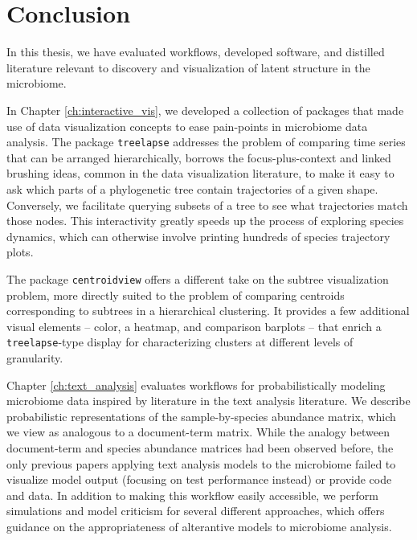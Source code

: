 \chapter{Conclusion}
\label{ch:conclusion}

In this thesis, we have evaluated workflows, developed software, and distilled
literature relevant to discovery and visualization of latent structure in the
microbiome.

In Chapter \ref{ch:interactive_vis}, we developed a collection of packages that
made use of data visualization concepts to ease pain-points in microbiome data
analysis. The package \texttt{treelapse} addresses the problem of comparing time
series that can be arranged hierarchically, borrows the focus-plus-context and
linked brushing ideas, common in the data visualization literature, to make it
easy to ask which parts of a phylogenetic tree contain trajectories of a given
shape. Conversely, we facilitate querying subsets of a tree to see what
trajectories match those nodes. This interactivity greatly speeds up the process
of exploring species dynamics, which can otherwise involve printing hundreds of
species trajectory plots.

The package \texttt{centroidview} offers a different take on the subtree
visualization problem, more directly suited to the problem of comparing
centroids corresponding to subtrees in a hierarchical clustering. It provides a
few additional visual elements -- color, a heatmap, and comparison barplots --
that enrich a \texttt{treelapse}-type display for characterizing clusters at
different levels of granularity.

Chapter \ref{ch:text_analysis} evaluates workflows for probabilistically
modeling microbiome data inspired by literature in the text analysis literature.
We describe probabilistic representations of the sample-by-species abundance
matrix, which we view as analogous to a document-term matrix. While the analogy
between document-term and species abundance matrices had been observed before,
the only previous papers applying text analysis models to the microbiome failed
to visualize model output (focusing on test performance instead) or provide code
and data. In addition to making this workflow easily accessible, we perform
simulations and model criticism for several different approaches, which offers
guidance on the appropriateness of alterantive models to microbiome analysis.

